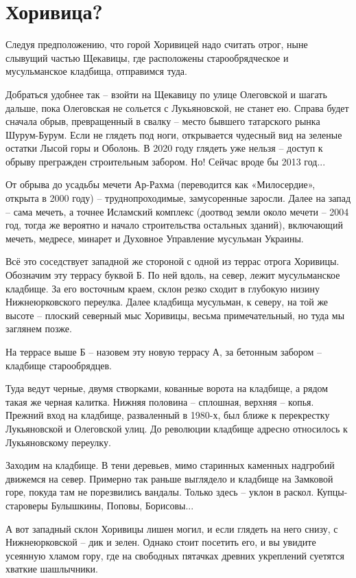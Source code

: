 \chapter{Хоривица?}

Следуя предположению, что горой Хоривицей надо считать отрог, ныне слывущий частью Щекавицы, где расположены старообрядческое и мусульманское кладбища, отправимся туда. 

Добраться удобнее так – взойти на Щекавицу по улице Олеговской и шагать дальше, пока Олеговская не сольется с Лукьяновской, не станет ею. Справа будет сначала обрыв, превращенный в свалку – место бывшего татарского рынка Шурум-Бурум. Если не глядеть под ноги, открывается чудесный вид на зеленые остатки Лысой горы и Оболонь. В 2020 году глядеть уже нельзя – доступ к обрыву прегражден строительным забором. Но! Сейчас вроде бы 2013 год...

От обрыва до усадьбы мечети Ар-Рахма (переводится как «Милосердие», открыта в 2000 году) – труднопроходимые, замусоренные заросли. Далее на запад – сама мечеть, а точнее Исламский комплекс (доотвод земли около мечети – 2004 год, тогда же вероятно и начало строительства остальных зданий), включающий мечеть, медресе, минарет и Духовное Управление мусульман Украины.

Всё это соседствует западной же стороной с одной из террас отрога Хоривицы. Обозначим эту террасу буквой Б. По ней вдоль, на север, лежит мусульманское кладбище. За его восточным краем, склон резко сходит в глубокую низину Нижнеюрковского переулка. Далее кладбища мусульман, к северу, на той же высоте – плоский северный мыс Хоривицы, весьма примечательный, но туда мы заглянем позже.

На террасе выше Б – назовем эту новую террасу А, за бетонным забором – кладбище старообрядцев.

Туда ведут черные, двумя створками, кованные ворота на кладбище, а рядом такая же черная калитка. Нижняя половина – сплошная, верхняя – копья. Прежний вход на кладбище, разваленный в 1980-х, был ближе к перекрестку Лукьяновской и Олеговской улиц. До революции кладбище адресно относилось к Лукьяновскому переулку.

Заходим на кладбище. В тени деревьев, мимо старинных каменных надгробий движемся на север. Примерно так раньше выглядело и кладбище на Замковой горе, покуда там не порезвились вандалы. Только здесь – уклон в раскол. Купцы-староверы Булышкины, Поповы, Борисовы...

А вот западный склон Хоривицы лишен могил, и если глядеть на него снизу, с Нижнеюрковской – дик и зелен. Однако стоит посетить его, и вы увидите усеянную хламом гору, где на свободных пятачках древних укреплений суетятся хваткие шашлычники. 

